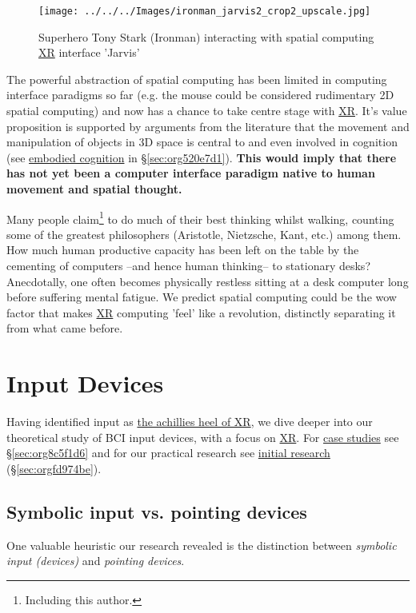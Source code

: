 \documentclass[logo,bsc,singlespacing,parskip]{infthesis}
\begin{document}
\begin{figure}[h]
\centering
\texttt{[image: ../../../Images/ironman\_jarvis2\_crop2\_upscale.jpg]}
\caption{Superhero Tony Stark (Ironman) interacting with spatial computing \hyperref[org88b0f70]{XR} interface 'Jarvis'}
\end{figure}

The powerful abstraction of spatial computing has been limited in computing interface paradigms so far (e.g. the mouse could be considered rudimentary 2D spatial computing) and now has a chance to take centre stage with \hyperref[org88b0f70]{XR}.
It's value proposition is supported by arguments from the literature that the movement and manipulation of objects in 3D space is central to and even involved in cognition (see \hyperref[orgb456c86]{embodied cognition} in \S \ref{sec:org520e7d1}).
\textbf{This would imply that there has not yet been a computer interface paradigm native to human movement and spatial thought.}

Many people claim\footnote{Including this author.} to do much of their best thinking whilst walking, counting some of the greatest philosophers (Aristotle, Nietzsche, Kant, etc.) among them.
How much human productive capacity has been left on the table by the cementing of computers --and hence human thinking-- to stationary desks?
Anecdotally, one often becomes physically restless sitting at a desk computer long before suffering mental fatigue.
We predict spatial computing could be the wow factor that makes \hyperref[org88b0f70]{XR} computing 'feel' like a revolution, distinctly separating it from what came before.

\chapter{Input Devices}
\label{sec:org90a34d8}
Having identified input as \hyperref[sec:org9bcda9d]{the achillies heel of XR}, we dive deeper into our theoretical study of BCI input devices, with a focus on \hyperref[org88b0f70]{XR}.
For \hyperref[sec:org8c5f1d6]{case studies} see \S \ref{sec:org8c5f1d6} and for our practical research see \hyperref[sec:orgfd974be]{initial research} (\S \ref{sec:orgfd974be}).
\section{Symbolic input vs. pointing devices}
\label{sec:orgbf92c55}
One valuable heuristic our research revealed is the distinction between \emph{symbolic input (devices)} and \emph{pointing devices}.
\end{document}
